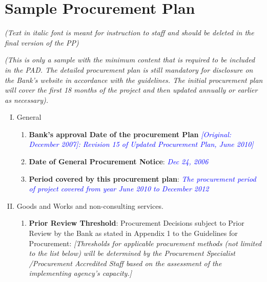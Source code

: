 \chapter{Sample Procurement Plan}\label{app_proc_plan}

\noindent\textit{(Text  in italic font is meant for instruction to staff and should be deleted in the final version of the  PP)}

\textit{(This is only a sample with the minimum content that is required to be included in the PAD. The detailed procurement plan is still mandatory for disclosure on the Bank's website in accordance with the guidelines. The initial procurement plan will cover the first 18 months of the project and then updated annually or earlier as necessary).
}
\begin{enumerate}[I.]
\item 	General
	\begin{enumerate}[1.]
	\item \textbf{Bank's approval Date of the procurement Plan} \textcolor{blue}{\textit{[Original: December 2007]: Revision 15 of Updated Procurement Plan, June 2010]}}
	\item \textbf{Date of General Procurement Notice}: \textcolor{blue}{\textit{Dec 24, 2006}}
	\item \textbf{Period covered by this procurement plan}: \textcolor{blue}{\textit{The procurement period of project covered from year June 2010 to December 2012}}
	\end{enumerate}

\item Goods and Works and non-consulting services.

	\begin{enumerate}[1.]

	\item	\textbf{Prior Review Threshold}: Procurement Decisions subject to Prior Review by the Bank as stated in Appendix 1 to the Guidelines for Procurement: \textit{[Thresholds for applicable procurement methods (not limited to the list below) will be determined by the Procurement Specialist /Procurement Accredited Staff based on the assessment of the implementing agency's capacity.]}


\end{enumerate}
\end{enumerate}
